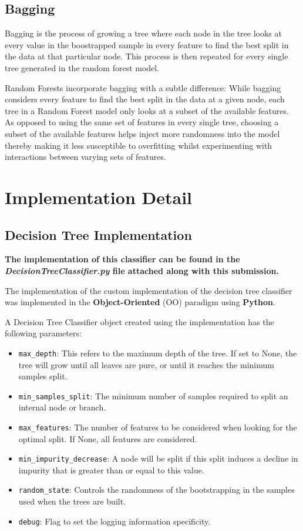 \begin{appendices}
  \subsection{Bagging} \label{app:sec:bagging}

  Bagging is the process of growing a tree where each node in the tree looks at every value in the boostrapped sample in every feature to find the best split in the data at that particular node. This process is then repeated for every single tree generated in the random forest model.

  Random Forests incorporate bagging with a subtle difference: While bagging considers every feature to find the best split in the data at a given node, each tree in a Random Forest model only looks at a subset of the available features.
  As opposed to using the same set of features in every single tree, choosing a subset of the available features helps inject more randomness into the model thereby making it less susceptible to overfitting whilst experimenting with interactions between varying sets of features.

  \section{Implementation Detail}

  \subsection{Decision Tree Implementation} \label{app:sec:dt_implementation}

  \textbf{The implementation of this classifier can be found in the \textit{DecisionTreeClassifier.py} file attached along with this submission.}

  The implementation of the custom implementation of the decision tree classifier was implemented in the \textbf{Object-Oriented} (OO) paradigm using \textbf{Python}.

  A Decision Tree Classifier object created using the implementation has the following parameters:
  \begin{itemize}
    \item \texttt{max\_depth}: This refers to the maximum depth of the tree. If set to None, the tree will grow until all leaves are pure, or until it reaches the minimum samples split.
    \item \texttt{min\_samples\_split}: The minimum number of samples required to split an internal node or branch.
    \item \texttt{max\_features}: The number of features to be considered when looking for the optimal split. If None, all features are considered.
    \item \texttt{min\_impurity\_decrease}: A node will be split if this split induces a decline in impurity that is greater than or equal to this value.
    \item \texttt{random\_state}: Controls the randomness of the bootstrapping in the samples used when the trees are built.
    \item \texttt{debug}: Flag to set the logging information specificity.
  \end{itemize}


\end{appendices}
